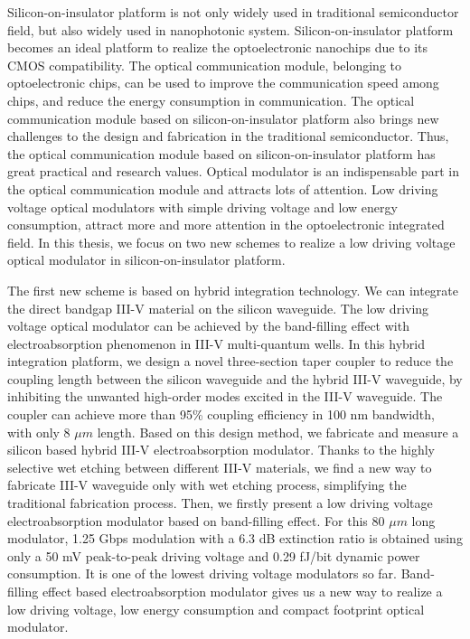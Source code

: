 \begin{englishabstract}
Silicon-on-insulator platform is not only widely used in traditional semiconductor field, but also widely used in nanophotonic system. Silicon-on-insulator platform becomes an ideal platform to realize the optoelectronic nanochips due to its CMOS compatibility. The optical communication module, belonging to optoelectronic chips, can be used to improve the communication speed among chips, and reduce the energy consumption in communication. The optical communication module based on silicon-on-insulator platform also brings new challenges to the design and fabrication in the traditional semiconductor. Thus, the optical communication module based on silicon-on-insulator platform has great practical and research values. Optical modulator is an indispensable part in the optical communication module and attracts lots of attention. Low driving voltage optical modulators with simple driving voltage and low energy consumption, attract more and more attention in the optoelectronic integrated field. In this thesis, we focus on two new schemes to realize a low driving voltage optical modulator in silicon-on-insulator platform.

The first new scheme is based on hybrid integration technology. We can integrate the direct bandgap III-V material on the silicon waveguide. The low driving voltage optical modulator can be achieved by the band-filling effect with electroabsorption phenomenon in III-V multi-quantum wells. In this hybrid integration platform, we design a novel three-section taper coupler to reduce the coupling length between the silicon waveguide and the hybrid III-V waveguide, by inhibiting the unwanted high-order modes excited in the III-V waveguide. The coupler can achieve more than 95\% coupling efficiency in 100 nm bandwidth, with only 8 $\mu m$ length. Based on this design method, we fabricate and measure a silicon based hybrid III-V electroabsorption modulator. Thanks to the highly selective wet etching between different III-V materials, we find a new way to fabricate III-V waveguide only with wet etching process, simplifying the traditional  fabrication process. Then, we firstly present a low driving voltage electroabsorption modulator based on band-filling effect. For this 80 $\mu m$ long modulator, 1.25 Gbps modulation with a 6.3 dB extinction ratio is obtained using only a 50 mV peak-to-peak driving voltage and 0.29 fJ/bit dynamic power consumption. It is one of the lowest driving voltage modulators so far. Band-filling effect based electroabsorption modulator gives us a new way to realize a low driving voltage, low energy consumption and compact footprint optical modulator.


\end{englishabstract}
